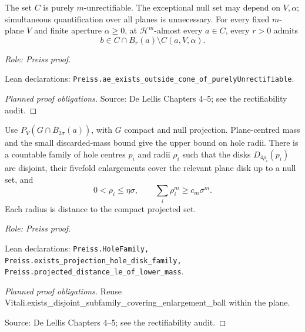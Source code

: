 \begin{lemma}
\label{lem:pure-cone-escape}







The set \(C\) is purely \(m\)-unrectifiable. The exceptional null set may depend on \(V,\alpha\); simultaneous quantification over all planes is unnecessary.
For every fixed \(m\)-plane \(V\) and finite aperture \(\alpha\geq0\), at \(\mathcal H^m\)-almost every \(a\in C\), every \(r>0\) admits
\[
 b\in C\cap B_r(a)\setminus C(a,V,\alpha).
\]
\par\emph{Role: Preiss proof.}
\par Lean declarations: \texttt{Preiss.ae\_exists\_outside\_cone\_of\_purelyUnrectifiable}.
\end{lemma}
\begin{proof}[Planned proof obligations]

\par Source: De Lellis Chapters 4--5; see the rectifiability audit.
\end{proof}

\begin{lemma}
\label{lem:projection-hole-cover}







Use \(P_V(G\cap\overline B_{2\sigma}(a))\), with \(G\) compact and null projection. Plane-centred mass and the small discarded-mass bound give the upper bound on hole radii.
There is a countable family of hole centres \(p_i\) and radii \(\rho_i\) such that the disks \(D_{4\rho_i}(p_i)\) are disjoint, their fivefold enlargements cover the relevant plane disk up to a null set, and
\[
 0<\rho_i\leq\eta\sigma,\qquad \sum_i\rho_i^m\geq c_m\sigma^m.
\]
Each radius is distance to the compact projected set.
\par\emph{Role: Preiss proof.}
\par Lean declarations: \texttt{Preiss.HoleFamily, Preiss.exists\_projection\_hole\_disk\_family, Preiss.projected\_distance\_le\_of\_lower\_mass}.
\end{lemma}
\begin{proof}[Planned proof obligations]

Reuse Vitali.exists\_disjoint\_subfamily\_covering\_enlargement\_ball within the plane.
\par Source: De Lellis Chapters 4--5; see the rectifiability audit.
\end{proof}

